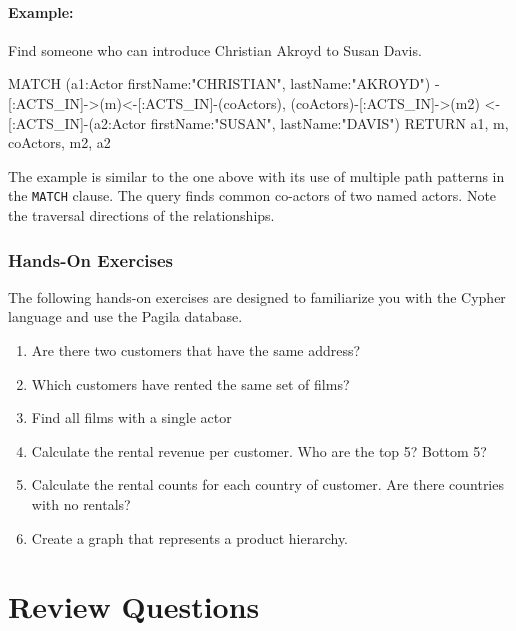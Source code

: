 \paragraph*{Example:} Find someone who can introduce Christian Akroyd to Susan Davis.

\begin{samepage}
\begin{cyphercode}
MATCH (a1:Actor {firstName:"CHRISTIAN", lastName:"AKROYD"})
        -[:ACTS_IN]->(m)<-[:ACTS_IN]-(coActors),
      (coActors)-[:ACTS_IN]->(m2)
        <-[:ACTS_IN]-(a2:Actor {firstName:"SUSAN", lastName:"DAVIS"})
RETURN a1, m, coActors, m2, a2
\end{cyphercode}
\end{samepage}

The example is similar to the one above with its use of multiple path patterns in the \texttt{MATCH} clause. The query finds common co-actors of two named actors. Note the traversal directions of the relationships.

\begin{tcolorbox}[colback=code]
\subsubsection*{Hands-On Exercises}

The following hands-on exercises are designed to familiarize you with the Cypher language and use the Pagila database.

\begin{enumerate}[nosep]
	\item Are there two customers that have the same address?
	\item Which customers have rented the same set of films?
	\item Find all films with a single actor
	\item Calculate the rental revenue per customer. Who are the top 5? Bottom 5?
	\item Calculate the rental counts for each country of customer. Are there countries with no rentals?
	\item Create a graph that represents a product hierarchy.
\end{enumerate}
\end{tcolorbox}

\section{Review Questions}


